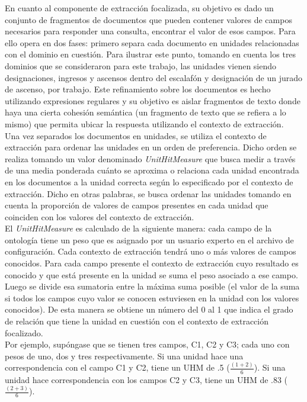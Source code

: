 En cuanto al componente de extracción focalizada, su objetivo es dado un conjunto de fragmentos de documentos que pueden contener valores de campos necesarios para responder una consulta, encontrar el valor de esos campos. Para ello opera en dos fases: primero separa cada documento en unidades relacionadas con el dominio en cuestión. Para ilustrar este punto, tomando en cuenta los tres dominios que se consideraron para este trabajo, las unidades vienen siendo designaciones, ingresos y ascensos dentro del escalafón y designación de un jurado de ascenso, por trabajo. Este refinamiento sobre los documentos es hecho utilizando expresiones regulares y su objetivo es aislar fragmentos de texto donde haya una cierta cohesión semántica (un fragmento de texto que se refiera a lo mismo) que permita ubicar la respuesta utilizando el contexto de extracción. \\

Una vez separados los documentos en unidades, se utiliza el contexto de extracción para ordenar las unidades en un orden de preferencia. Dicho orden se realiza tomando un valor denominado \emph{UnitHitMeasure} que busca medir a través de una media ponderada cuánto se aproxima o relaciona cada unidad encontrada en los documentos a la unidad correcta según lo especificado por el contexto de extracción. Dicho en otras palabras, se busca ordenar las unidades tomando en cuenta la proporción de valores de campos presentes en cada unidad que coinciden con los valores del contexto de extracción.\\

El \emph{UnitHitMeasure} es calculado de la siguiente manera: cada campo de la ontología tiene un peso que es asignado por un usuario experto en el archivo de configuración. Cada contexto de extracción tendrá uno o más valores de campos conocidos. Para cada campo presente el contexto de extracción cuyo resultado es conocido y que está presente en la unidad se suma el peso asociado a ese campo. Luego se divide esa sumatoria entre la máxima suma posible (el valor de la suma si todos los campos cuyo valor se conocen estuviesen en la unidad con los valores conocidos). De esta manera se obtiene un número del 0 al 1 que indica el grado de relación que tiene la unidad en cuestión con el contexto de extracción focalizado.\\

Por ejemplo, supóngase que se tienen tres campos, C1, C2 y C3; cada uno con pesos de uno, dos y tres respectivamente. Si una unidad hace una correspondencia con el campo C1 y C2, tiene un UHM de .5 ($\frac{(1+2)}{6}$). Si una unidad hace correspondencia con los campos C2 y C3, tiene un UHM de .83 ($\frac{(2+3)}{6}$). \\

